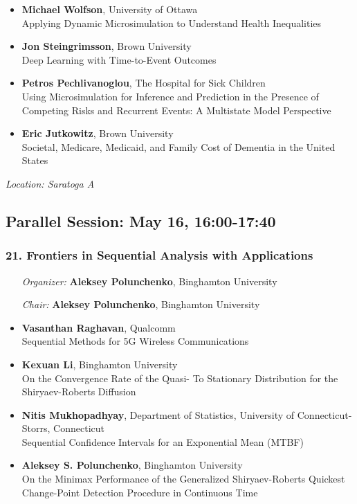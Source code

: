 \begin{itemize}
\item \textbf{Michael Wolfson}, University of Ottawa \\
Applying Dynamic Microsimulation to Understand Health Inequalities
\item \textbf{Jon Steingrimsson}, Brown University \\
Deep Learning with Time-to-Event Outcomes
\item \textbf{Petros Pechlivanoglou}, The Hospital for Sick Children \\
Using Microsimulation for Inference and Prediction in the Presence of Competing Risks and Recurrent Events: A Multistate Model Perspective
\item \textbf{Eric Jutkowitz}, Brown University \\
Societal, Medicare, Medicaid, and Family Cost of Dementia in the United States
\end{itemize}

\emph{Location: Saratoga A}

\subsection*{Parallel Session: May 16, 16:00-17:40}

\subsubsection*{21. Frontiers in Sequential Analysis with Applications}

\begin{enumerate}[align=left]
\item [\emph{Organizer:}] \textbf{Aleksey Polunchenko}, Binghamton University
\item [\emph{Chair:}] \textbf{Aleksey Polunchenko}, Binghamton University
\end{enumerate}

\begin{itemize}
\item \textbf{Vasanthan Raghavan}, Qualcomm \\
Sequential Methods for 5G Wireless Communications
\item \textbf{Kexuan Li}, Binghamton University \\
On the Convergence Rate of the Quasi- To Stationary Distribution for the Shiryaev-Roberts Diffusion
\item \textbf{Nitis Mukhopadhyay}, Department of Statistics, University of Connecticut-Storrs, Connecticut \\
Sequential Confidence Intervals for an Exponential Mean (MTBF)
\item \textbf{Aleksey S. Polunchenko}, Binghamton University \\
On the Minimax Performance of the Generalized Shiryaev-Roberts Quickest Change-Point Detection Procedure in Continuous Time
\end{itemize}

